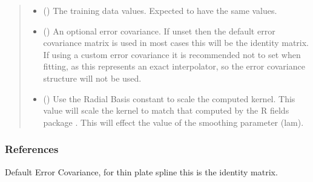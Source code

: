\documentclass[letterpaper,10pt,english]{sphinxmanual}
\begin{document}
\begin{fulllineitems}
\begin{quote}
\begin{description}
\begin{itemize}
\item {}
\sphinxAtStartPar
{} () \textendash{} The training data values. Expected to have the same  values.

\item {}
\sphinxAtStartPar
{} () \textendash{} An optional error covariance. If unset then the default error covariance
matrix is used \sphinxhyphen{} in most cases this will be the identity matrix. If
using a custom error covariance it is recommended not to set 
when fitting, as this represents an exact interpolator, so the error
covariance structure will not be used.

\item {}
\sphinxAtStartPar
{} () \textendash{} Use the Radial Basis constant to scale the computed kernel. This value
will scale the kernel to match that computed by the R fields package
. This will effect the value of the smoothing parameter (lam).

\end{itemize}

\end{description}\end{quote}
\subsubsection*{References}

\sphinxAtStartPar
{}

\begin{fulllineitems}
\label{\detokenize{splines:glomar_gridding.spline.ThinPlateSpline.default_error_cov}}
\pysigstartsignatures
\pysigline
{}
\pysigstopsignatures
\sphinxAtStartPar
Default Error Covariance, for thin plate spline this is the identity
matrix.


\end{fulllineitems}
\end{fulllineitems}
\end{document}
